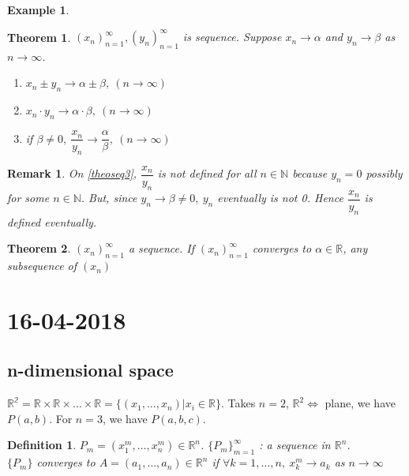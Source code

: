 \documentclass[a4paper,10pt]{article}
\newtheorem{remark}{Remark}[]
\newtheorem{theo}{Theorem}[]
\newtheorem{defi}{Definition}[]
\newtheorem{ex}{Example}[]
\begin{document}
\begin{ex}
	
\end{ex}

\begin{theo}
	$ (x_{n})_{n=1}^{\infty} , (y_{n})_{n=1}^{\infty} $ is sequence. Suppose $ x_{n} \rightarrow \alpha $ and $ y_{n} \rightarrow \beta $ as $ n\rightarrow \infty $.
	\begin{enumerate}
		\item $ x_{n} \pm y_{n} \rightarrow \alpha \pm \beta , \ (n \rightarrow \infty) $
		\item $ x_{n} \cdot y_{n} \rightarrow \alpha \cdot \beta , \ (n \rightarrow \infty) $
		\item \label{theoseq3} if $ \beta \neq 0, \ \dfrac{x_{n}}{y_{n}} \rightarrow \dfrac{\alpha}{\beta} , \ (n \rightarrow \infty) $
	\end{enumerate}
\end{theo}

\begin{remark}
	On \ref{theoseq3}, $ \dfrac{x_{n}}{y_{n}} $ is not defined for all $ n \in \mathbb{N} $ because $ y_{n}=0 $ possibly for some $ n \in \mathbb{N} $. But, since $ y_{n} \rightarrow \beta \neq 0, \ y_{n} $ eventually is not 0. Hence $ \dfrac{x_{n}}{y_{n}} $ is defined eventually.
\end{remark}

\begin{theo}
	$ (x_{n})_{n=1}^{\infty} $ a sequence. If $ (x_{n})_{n=1}^{\infty} $ converges to $ \alpha \in \mathbb{R} $, any subsequence of $ (x_{n}) $
\end{theo}

\section{16-04-2018}

\subsection{n-dimensional space}
$ \mathbb{R^2} = \mathbb{R} \times \mathbb{R} \times \dots \times \mathbb{R}  = \{ (x_{1}, \dots, x_{n}) | x_{i}\in \mathbb{R} \} $.
Takes $ n=2 $, $ \mathbb{R}^2  \Leftrightarrow $ plane, we have $ P(a,b) $. For $ n=3 $, we have $ P(a,b,c) $.

\begin{defi}
	$ P_{m} = (x_{1}^{m}, \dots, x_{n}^{m}) \in \mathbb{R}^n$. $ \{ P_{m} \}_{m=1}^{\infty} $ :  a sequence in $ \mathbb{R}^{n} $.\\
	 $ \{P_{m}\} $ converges to $ A = (a_{1}, \dots , a_{n}) \in \mathbb{R}^n $ if $ \forall k=1, \dots, n , \ x_{k}^{m} \rightarrow a_{k} $ as $ n \rightarrow \infty $
\end{defi}
\end{document}
